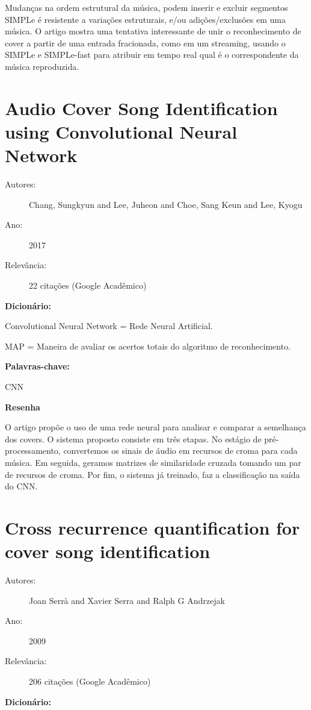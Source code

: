 Mudanças na ordem estrutural da música, podem inserir e excluir segmentos SIMPLe é resistente a variações estruturais, e/ou adições/exclusões em uma música. O artigo mostra uma tentativa interessante de unir o reconhecimento de cover a partir de uma entrada fracionada, como em um streaming, usando o SIMPLe e SIMPLe-fast para atribuir em tempo real qual é o correspondente da música reproduzida.

\section{Audio Cover Song Identification using Convolutional Neural Network}

\begin{description}
\item[Autores:] Chang, Sungkyun and Lee, Juheon and Choe, Sang Keun and Lee, Kyogu
\item[Ano:] 2017
\item[Relevância:] 22 citações (Google Acadêmico)
\end{description}

{\bfseries Dicionário:}

\item Convolutional Neural Network = Rede Neural Artificial.

\item MAP = Maneira de avaliar os acertos totais do algoritmo de reconhecimento.


{\bfseries Palavras-chave:}

\item CNN

{\bfseries Resenha}

O artigo propõe o uso de uma rede neural para analisar e comparar a semelhança dos covers. O sistema proposto consiste em três etapas. No estágio de pré-processamento, convertemos os sinais de áudio em recursos de croma para cada música. Em seguida, geramos matrizes de similaridade cruzada tomando um par de recursos de croma. Por fim, o sistema já treinado, faz a classificação na saída do CNN.


\section{Cross recurrence quantification for cover song identification}

\begin{description}
\item[Autores:] Joan Serrà and Xavier Serra and Ralph G Andrzejak
\item[Ano:] 2009
\item[Relevância:] 206 citações (Google Acadêmico)
\end{description}
{\bfseries Dicionário:}

